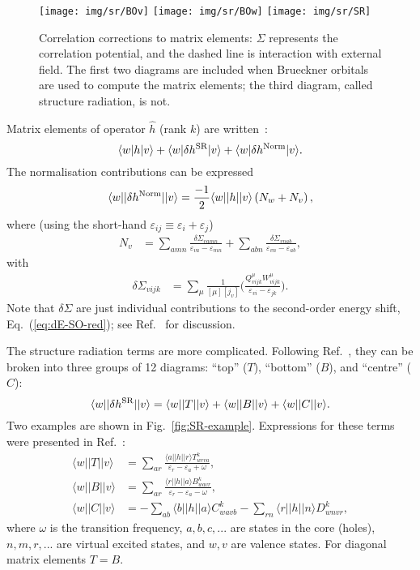 \documentclass[10pt,twocolumn,a4paper]{article}%
\newcommand{\bra}[1]{\ensuremath{\langle #1|}}	%
\newcommand{\ket}[1]{\ensuremath{|#1\rangle}}
\newcommand{\be}{\begin{equation}}
\newcommand{\ee}{\end{equation}}
\def\en{\ensuremath{\varepsilon}}
\newcommand{\w}{\ensuremath{\omega}}
\begin{document}
\begin{figure}%
\centering
\texttt{[image: img/sr/BOv]}
\texttt{[image: img/sr/BOw]}
\texttt{[image: img/sr/SR]}
\caption{\label{fig:SR1}\small Correlation corrections to matrix elements: $\Sigma$ represents the correlation potential, and the dashed line is interaction with external field. The first two diagrams are included when Brueckner orbitals are used to compute the matrix elements; the third diagram, called structure radiation, is not.}
\end{figure}

Matrix elements of operator $\hat h$ (rank $k$) are written~\cite{Blundell1987,Dzuba1987jpbRPA}:
\be
\bra{w}h\ket{v} + \bra{w}\delta h^{\rm SR}\ket{v}+\bra{w}\delta h^{\rm Norm}\ket{v}.
\ee
The normalisation contributions can be expressed
\be
\bra{w}|\delta h^{\rm Norm}|\ket{v} = \frac{-1}{2}\bra{w}|h|\ket{v}\left(N_{w}  +  N_{v}\right),
\ee
where (using the short-hand $\en_{ij}\equiv\en_i+\en_j$)
\begin{align}
N_v &=
 \sum_{amn} \frac{\delta\Sigma_{vamn}}{\en_{va} - \en_{mn}}
+\sum_{abn}\frac{\delta\Sigma_{vnab}}{\en_{vn}-\en_{ab}} ,
\end{align}
with
\begin{align}
\delta\Sigma_{vijk} &=\sum_\mu \frac{1}{[\mu][j_v]}\Bigg(
\frac{Q^\mu_{vijk}W^\mu_{vijk}}{\en_{vi} - \en_{jk}}
 \Bigg).
\end{align}
Note that $\delta\Sigma$ are just individual contributions to the second-order energy shift, Eq.~(\ref{eq:dE-SO-red});
see Ref.~\cite{Dzuba1987jpbRPA} for discussion.








The structure radiation terms are more complicated.
Following Ref.~\cite{JohLiuSap96}, they can be broken into three groups of 12 diagrams: ``top'' ($T$), ``bottom'' ($B$), and ``centre'' ($C$):
\[
\bra{w}|\delta h^{\rm SR}|\ket{v} = \bra{w}|T|\ket{v} + \bra{w}|B|\ket{v} + \bra{w}|C|\ket{v}.
\]
Two examples are shown in Fig.~\ref{fig:SR-example}.
Expressions for these terms were presented in Ref.~\cite{JohLiuSap96}:
\begin{align}
\bra{w}|T|\ket{v} &= \sum_{ar} \frac{\bra{a}|h|\ket{r} T^k_{wrva}}{\en_r - \en_a + \w},\\
\bra{w}|B|\ket{v} &= \sum_{ar} \frac{\bra{r}|h|\ket{a} B^k_{wavr}}{\en_r - \en_a - \w},\\
\bra{w}|C|\ket{v} &= -\sum_{ab} {\bra{b}|h|\ket{a} C^{k}_{wavb}} - \sum_{rn} {\bra{r}|h|\ket{n} D^{k}_{wnvr}},
\end{align}
where $\omega$ is the transition frequency,
$a,b,c,...$ are states in the core (holes), $n,m,r,...$ are virtual excited states, and $w,v$ are valence states.
For diagonal matrix elements $T=B$.
\end{document}
